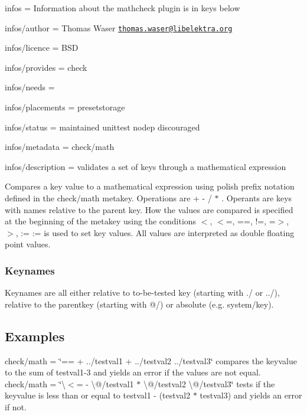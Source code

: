 
\begin{DoxyItemize}
\item infos = Information about the mathcheck plugin is in keys below
\item infos/author = Thomas Waser \href{mailto:thomas.waser@libelektra.org}{\tt thomas.\+waser@libelektra.\+org}
\item infos/licence = B\+S\+D
\item infos/provides = check
\item infos/needs =
\item infos/placements = presetstorage
\item infos/status = maintained unittest nodep discouraged
\item infos/metadata = check/math
\item infos/description = validates a set of keys through a mathematical expression
\end{DoxyItemize}

Compares a key value to a mathematical expression using polish prefix notation defined in the {\ttfamily check/math} metakey. Operations are {\ttfamily + -\/ / $\ast$} . Operants are keys with names relative to the parent key. How the values are compared is specified at the beginning of the metakey using the conditions {\ttfamily $<$, $<$=, ==, !=, =$>$, $>$, \+:=} {\ttfamily \+:=} is used to set key values. All values are interpreted as {\ttfamily double} floating point values.

\subsubsection*{Keynames}

Keynames are all either relative to to-\/be-\/tested key (starting with {\ttfamily ./} or {\ttfamily ../}), relative to the parentkey (starting with {\ttfamily @/}) or absolute (e.\+g. {\ttfamily system/key}).

\subsection*{Examples}

{\ttfamily check/math = \char`\"{}== + ../testval1 + ../testval2 ../testval3\char`\"{}} compares the keyvalue to the sum of testval1-\/3 and yields an error if the values are not equal. {\ttfamily check/math = \char`\"{}\textbackslash{}$<$= -\/ \textbackslash{}@/testval1 $\ast$ \textbackslash{}@/testval2 \textbackslash{}@/testval3\char`\"{}} tests if the keyvalue is less than or equal to testval1 -\/ (testval2 $\ast$ testval3) and yields an error if not.

